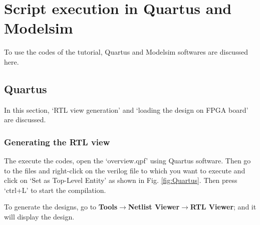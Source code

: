 \chapter{Script execution in Quartus and Modelsim}\label{QuartusModelsim}

\graphicspath{{Chapters/Overview/Figures/}}

To use the codes of the tutorial, Quartus and Modelsim softwares are discussed here. 

\section{Quartus}
In this section, `RTL view generation' and `loading the design on FPGA board' are discussed. 

\subsection{Generating the RTL view}
The execute the codes, open the `overview.qpf' using Quartus software. Then go to the files and right-click on the verilog file to which you want to execute and click on `Set as Top-Level Entity' as shown in Fig. \ref{fig:Quartus}. Then press `ctrl+L' to start the compilation. 

To generate the designs, go to \textbf{Tools$\rightarrow$Netlist Viewer$\rightarrow$RTL Viewer}; and it will display the design. 

